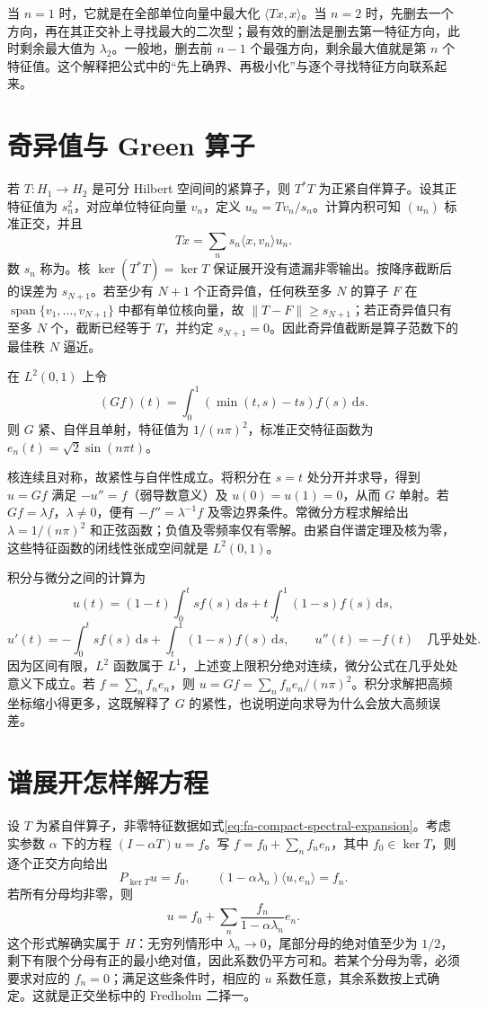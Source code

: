 \documentclass[UTF8,12pt,a4paper,fontset=fandol]{ctexbook}
\begin{document}
当 $n=1$ 时，它就是在全部单位向量中最大化 $\langle Tx,x\rangle$。当 $n=2$ 时，先删去一个方向，再在其正交补上寻找最大的二次型；最有效的删法是删去第一特征方向，此时剩余最大值为 $\lambda_2$。一般地，删去前 $n-1$ 个最强方向，剩余最大值就是第 $n$ 个特征值。这个解释把公式中的“先上确界、再极小化”与逐个寻找特征方向联系起来。

\section{奇异值与 Green 算子}
若 $T:H_1\to H_2$ 是可分 Hilbert 空间间的紧算子，则 $T^*T$ 为正紧自伴算子。设其正特征值为 $s_n^2$，对应单位特征向量 $v_n$，定义 $u_n=Tv_n/s_n$。计算内积可知 $(u_n)$ 标准正交，并且
\[
 Tx=\sum_n s_n\langle x,v_n\rangle u_n.
\]
数 $s_n$ 称为。核 $\ker(T^*T)=\ker T$ 保证展开没有遗漏非零输出。按降序截断后的误差为 $s_{N+1}$。若至少有 $N+1$ 个正奇异值，任何秩至多 $N$ 的算子 $F$ 在 $\operatorname{span}\{v_1,\ldots,v_{N+1}\}$ 中都有单位核向量，故 $\|T-F\|\geq s_{N+1}$；若正奇异值只有至多 $N$ 个，截断已经等于 $T$，并约定 $s_{N+1}=0$。因此奇异值截断是算子范数下的最佳秩 $N$ 逼近。

\begin{example}\label{ex:fa-green}
在 $L^2(0,1)$ 上令
\[
 (Gf)(t)=\int_0^1(\min(t,s)-ts)f(s)\,\mathrm ds.
\]
则 $G$ 紧、自伴且单射，特征值为 $1/(n\pi)^2$，标准正交特征函数为 $e_n(t)=\sqrt2\sin(n\pi t)$。
\end{example}
\begin{solve}
核连续且对称，故紧性与自伴性成立。将积分在 $s=t$ 处分开并求导，得到 $u=Gf$ 满足 $-u''=f$（弱导数意义）及 $u(0)=u(1)=0$，从而 $G$ 单射。若 $Gf=\lambda f$，$\lambda\ne0$，便有 $-f''=\lambda^{-1}f$ 及零边界条件。常微分方程求解给出 $\lambda=1/(n\pi)^2$ 和正弦函数；负值及零频率仅有零解。由紧自伴谱定理及核为零，这些特征函数的闭线性张成空间就是 $L^2(0,1)$。
\end{solve}

积分与微分之间的计算为
\[
 u(t)=(1-t)\int_0^t sf(s)\,\mathrm ds
       +t\int_t^1(1-s)f(s)\,\mathrm ds,
\]
\[
 u'(t)=-\int_0^t sf(s)\,\mathrm ds
       +\int_t^1(1-s)f(s)\,\mathrm ds,
 \qquad u''(t)=-f(t)\quad\text{几乎处处}.
\]
因为区间有限，$L^2$ 函数属于 $L^1$，上述变上限积分绝对连续，微分公式在几乎处处意义下成立。若 $f=\sum_nf_ne_n$，则 $u=Gf=\sum_n f_n e_n/(n\pi)^2$。积分求解把高频坐标缩小得更多，这既解释了 $G$ 的紧性，也说明逆向求导为什么会放大高频误差。

\section{谱展开怎样解方程}
设 $T$ 为紧自伴算子，非零特征数据如式\eqref{eq:fa-compact-spectral-expansion}。考虑实参数 $\alpha$ 下的方程 $(I-\alpha T)u=f$。写 $f=f_0+\sum_nf_ne_n$，其中 $f_0\in\ker T$，则逐个正交方向给出
\[
 P_{\ker T}u=f_0,\qquad (1-\alpha\lambda_n)\langle u,e_n\rangle=f_n.
\]
若所有分母均非零，则
\[
 u=f_0+\sum_n\frac{f_n}{1-\alpha\lambda_n}e_n.
\]
这个形式解确实属于 $H$：无穷列情形中 $\lambda_n\to0$，尾部分母的绝对值至少为 $1/2$，剩下有限个分母有正的最小绝对值，因此系数仍平方可和。若某个分母为零，必须要求对应的 $f_n=0$；满足这些条件时，相应的 $u$ 系数任意，其余系数按上式确定。这就是正交坐标中的 Fredholm 二择一。
\end{document}
